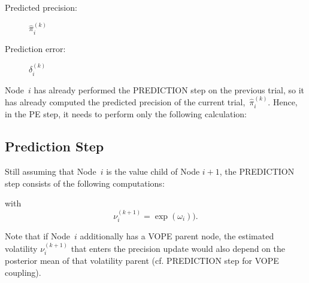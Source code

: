 \begin{description}
\item[Predicted precision:] 	$\hat{\pi}_{i}^{(k)}$
\item[Prediction error:]		$\delta_{i}^{(k)}$
\end{description}

Node~$i$ has already performed the \textsf{PREDICTION step} on the previous trial, so it has already computed the predicted precision of the current trial,~$\hat{\pi}_{i}^{(k)}$. Hence, in the \textsf{PE step}, it needs to perform only the following calculation:
\vspace{0.5cm}

\noindent
{}%
\vspace{0.5cm}

\noindent


\subsection{Prediction Step}
Still assuming that Node~$i$ is the value child of Node $i+1$, the \textsf{PREDICTION step} consists of the following computations:
\vspace{0.5cm}

\noindent
{}%
\vspace{0.5cm}

\noindent
with
\begin{equation*}
\nu_i^{(k+1)} = \exp(\omega_i)).
\end{equation*}

Note that if Node~$i$ additionally has a \textsf{VOPE} parent node, the estimated volatility $\nu_i^{(k+1)}$ that enters the precision update would also depend on the posterior mean of that volatility parent (cf. \textsf{PREDICTION step} for \textsf{VOPE} coupling).\\

